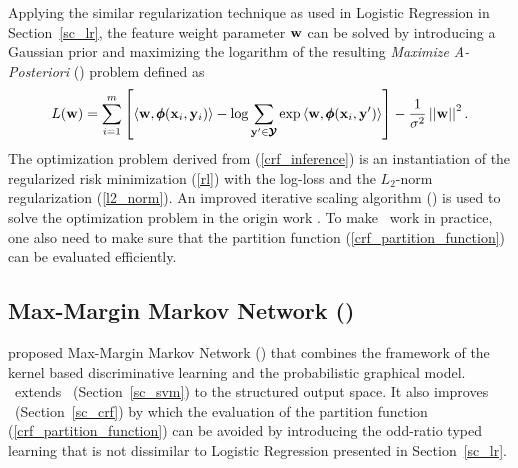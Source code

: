 {Applying the similar regularization technique as used in Logistic Regression in Section~\ref{sc_lr}, the feature weight parameter $\mathbf {w}$ can be solved by introducing a Gaussian prior and maximizing the logarithm of the resulting \textit{Maximize A-Posteriori} (\map) problem \citep{taskar02} defined as
\begin{align}
	L(\mathbf {w}) = \sum_{i=1}^{m}\left[\langle \mathbf {w}, \pmb \phi(\mathbf {x}_i,\mathbf {y}_i) \rangle-\log{\sum_{\mathbf {y}'\in\pmb {\mathcal{Y}}}{\exp{\langle \mathbf {w}, \pmb \phi(\mathbf {x}_i,\mathbf {y}') \rangle}}}\right] - \frac{1}{\sigma^2}\left|\left| \mathbf {w} \right|\right|^2. \label{crf_inference}
\end{align}
The optimization problem derived from (\ref{crf_inference}) is an instantiation of the regularized risk minimization (\ref{rl}) with the log-loss and the $L_2$-norm regularization (\ref{l2_norm}).
An improved iterative scaling algorithm (\iis) \citep{Pietra97inducing} is used to solve the optimization problem in the origin work \citep{lafferty01}.
To make \crf\ work in practice, one also need to make sure that the partition function (\ref{crf_partition_function}) can be evaluated efficiently.



%
% 
\subsection{Max-Margin Markov Network (\mmmn)} \label{sc_mmmn}

\citet{Taskar04max} proposed Max-Margin Markov Network (\mmmn) that combines the framework of the kernel based discriminative learning and the probabilistic graphical model.
\mmmn\ extends \svm\ (Section~\ref{sc_svm}) to the structured output space.
It also improves \crf\ (Section~\ref{sc_crf}) by which the evaluation of the partition function (\ref{crf_partition_function}) can be avoided by introducing the odd-ratio typed learning that is not dissimilar to Logistic Regression presented in Section~\ref{sc_lr}.

}

